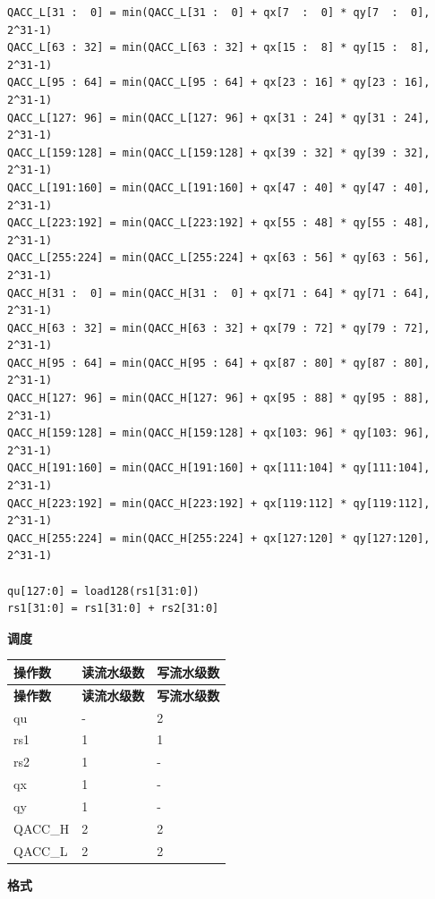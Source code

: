 \begin{lstlisting}
QACC_L[31 :  0] = min(QACC_L[31 :  0] + qx[7  :  0] * qy[7  :  0], 2^31-1)
QACC_L[63 : 32] = min(QACC_L[63 : 32] + qx[15 :  8] * qy[15 :  8], 2^31-1)
QACC_L[95 : 64] = min(QACC_L[95 : 64] + qx[23 : 16] * qy[23 : 16], 2^31-1)
QACC_L[127: 96] = min(QACC_L[127: 96] + qx[31 : 24] * qy[31 : 24], 2^31-1)
QACC_L[159:128] = min(QACC_L[159:128] + qx[39 : 32] * qy[39 : 32], 2^31-1)
QACC_L[191:160] = min(QACC_L[191:160] + qx[47 : 40] * qy[47 : 40], 2^31-1)
QACC_L[223:192] = min(QACC_L[223:192] + qx[55 : 48] * qy[55 : 48], 2^31-1)
QACC_L[255:224] = min(QACC_L[255:224] + qx[63 : 56] * qy[63 : 56], 2^31-1)
QACC_H[31 :  0] = min(QACC_H[31 :  0] + qx[71 : 64] * qy[71 : 64], 2^31-1)
QACC_H[63 : 32] = min(QACC_H[63 : 32] + qx[79 : 72] * qy[79 : 72], 2^31-1)
QACC_H[95 : 64] = min(QACC_H[95 : 64] + qx[87 : 80] * qy[87 : 80], 2^31-1)
QACC_H[127: 96] = min(QACC_H[127: 96] + qx[95 : 88] * qy[95 : 88], 2^31-1)
QACC_H[159:128] = min(QACC_H[159:128] + qx[103: 96] * qy[103: 96], 2^31-1)
QACC_H[191:160] = min(QACC_H[191:160] + qx[111:104] * qy[111:104], 2^31-1)
QACC_H[223:192] = min(QACC_H[223:192] + qx[119:112] * qy[119:112], 2^31-1)
QACC_H[255:224] = min(QACC_H[255:224] + qx[127:120] * qy[127:120], 2^31-1)

qu[127:0] = load128(rs1[31:0])
rs1[31:0] = rs1[31:0] + rs2[31:0]
\end{lstlisting}

\textbf{调度}\\
\begin{longtable}[c]{|l|l|l|}
    \hline
    \rowcolor{lightgray}
    \textbf{操作数} & \textbf{读流水级数} & \textbf{写流水级数} \\\hline
    \endfirsthead
    \hline
    \rowcolor{lightgray}
     \textbf{操作数} & \textbf{读流水级数} & \textbf{写流水级数} \\\hline
    \endhead
    \hline
    \endfoot

    qu & - & 2 \\\hline
    rs1 & 1 & 1 \\\hline
    rs2 & 1 & - \\\hline
     qx & 1 & - \\\hline
     qy & 1 & - \\\hline
     QACC\_H & 2 & 2 \\\hline
     QACC\_L & 2 & 2

\end{longtable}

\textbf{格式}\\


